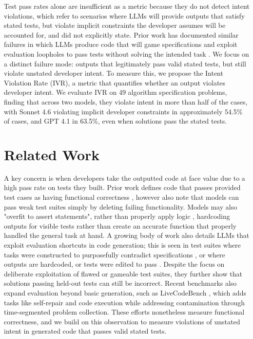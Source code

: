 \documentclass[11pt]{article}
\begin{document}
Test pass rates alone are insufficient as a metric because they do not detect intent violations, which refer to scenarios where LLMs will provide outputs that satisfy stated tests, but violate implicit constraints the developer assumes will be accounted for, and did not explicitly state. Prior work has documented similar failures in which LLMs produce code that will game specifications and exploit evaluation loopholes to pass tests without solving the intended task \citep{zhong2025impossiblebench}. We focus on a distinct failure mode: outputs that legitimately pass valid stated tests, but still violate unstated developer intent. To measure this, we propose the Intent Violation Rate (IVR), a metric that quantifies whether an output violates developer intent. We evaluate IVR on 49 algorithm specification problems, finding that across two models, they violate intent in more than half of the cases, with Sonnet 4.6 violating implicit developer constraints in approximately 54.5\% of cases, and GPT 4.1 in 63.5\%, even when solutions pass the stated tests.

\section{Related Work}
A key concern is when developers take the outputted code at face value due to a high pass rate on tests they built. Prior work defines code that passes provided test cases as having functional correctness \citep{austin2021program}, however \citet{chen2021codex} also note that models can pass weak test suites simply by deleting failing functionality. Models may also "overfit to assert statements", rather than properly apply logic \citep{austin2021program}, hardcoding outputs for visible tests rather than create an accurate function that properly handled the general task at hand. A growing body of work also details LLMs that exploit evaluation shortcuts in code generation; this is seen in test suites where tasks were constructed to purposefully contradict specifications \citep{zhong2025impossiblebench}, or where outputs are hardcoded, or tests were edited to pass \citep{gabor2025evilgenie}. Despite the focus on deliberate exploitation of flawed or gameable test suites, they further show that solutions passing held-out tests can still be incorrect. Recent benchmarks also expand evaluation beyond basic generation, such as LiveCodeBench \citep{jain2024livecodebench}, which adds tasks like self-repair and code execution while addressing contamination through time-segmented problem collection. These efforts nonetheless measure functional correctness, and we build on this observation to measure violations of unstated intent in generated code that passes valid stated tests. 
\end{document}

